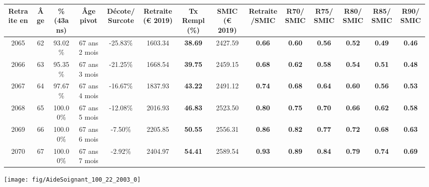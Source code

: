 \begin{adjustbox}{max width=\textwidth} 
\begin{tabular}[htb]{|c|c||c|c|c||c|c||c|c||c|c|c|c|c|} 
\hline 
 Retraite en &  Âge &  \%(43ans) &  Âge pivot &  Décote/Surcote &  Retraite (\euro{} 2019) &  Tx Rempl(\%) &  SMIC (\euro{} 2019) &  Retraite/SMIC &  R70/SMIC &  R75/SMIC &  R80/SMIC &  R85/SMIC &  R90/SMIC \\ 
\hline \hline 
 2065 &  62 &  93.02\% &  67 ans 2 mois &  -25.83\% &  1603.34 &  {\bf 38.69} &  2427.59 &  {\bf {\color{red} 0.66}} &  {\bf {\color{red} 0.60}} &  {\bf {\color{red} 0.56}} &  {\bf {\color{red} 0.52}} &  {\bf {\color{red} 0.49}} &  {\bf {\color{red} 0.46}} \\ 
\hline 
 2066 &  63 &  95.35\% &  67 ans 3 mois &  -21.25\% &  1668.54 &  {\bf 39.75} &  2459.15 &  {\bf {\color{red} 0.68}} &  {\bf {\color{red} 0.62}} &  {\bf {\color{red} 0.58}} &  {\bf {\color{red} 0.54}} &  {\bf {\color{red} 0.51}} &  {\bf {\color{red} 0.48}} \\ 
\hline 
 2067 &  64 &  97.67\% &  67 ans 4 mois &  -16.67\% &  1837.93 &  {\bf 43.22} &  2491.12 &  {\bf {\color{red} 0.74}} &  {\bf {\color{red} 0.68}} &  {\bf {\color{red} 0.64}} &  {\bf {\color{red} 0.60}} &  {\bf {\color{red} 0.56}} &  {\bf {\color{red} 0.53}} \\ 
\hline 
 2068 &  65 &  100.00\% &  67 ans 5 mois &  -12.08\% &  2016.93 &  {\bf 46.83} &  2523.50 &  {\bf {\color{red} 0.80}} &  {\bf {\color{red} 0.75}} &  {\bf {\color{red} 0.70}} &  {\bf {\color{red} 0.66}} &  {\bf {\color{red} 0.62}} &  {\bf {\color{red} 0.58}} \\ 
\hline 
 2069 &  66 &  100.00\% &  67 ans 6 mois &  -7.50\% &  2205.85 &  {\bf 50.55} &  2556.31 &  {\bf {\color{red} 0.86}} &  {\bf {\color{red} 0.82}} &  {\bf {\color{red} 0.77}} &  {\bf {\color{red} 0.72}} &  {\bf {\color{red} 0.68}} &  {\bf {\color{red} 0.63}} \\ 
\hline 
 2070 &  67 &  100.00\% &  67 ans 7 mois &  -2.92\% &  2404.97 &  {\bf 54.41} &  2589.54 &  {\bf {\color{red} 0.93}} &  {\bf {\color{red} 0.89}} &  {\bf {\color{red} 0.84}} &  {\bf {\color{red} 0.79}} &  {\bf {\color{red} 0.74}} &  {\bf {\color{red} 0.69}} \\ 
\hline 
\hline 
\end{tabular} 
\end{adjustbox} 
 
 \vspace{0.1cm} 

 {\hspace{-2.2cm}\texttt{[image: fig/AideSoignant\_100\_22\_2003\_0]}} 

